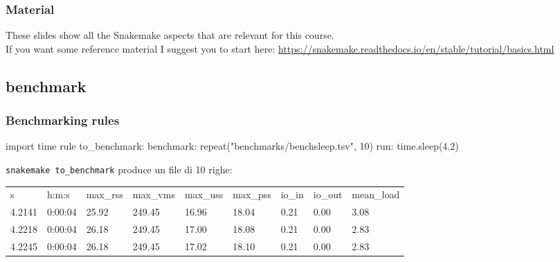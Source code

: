 \documentclass[xcolor=table]{beamer}
\begin{document}
\begin{frame}
\frametitle{Material}
These slides show all the Snakemake aspects that are relevant for this course. \\ If you want some reference material I suggest
you to start here: \url{https://snakemake.readthedocs.io/en/stable/tutorial/basics.html}
\end{frame}

\subsection{benchmark}
\begin{frame}[fragile]
\frametitle{Benchmarking rules}
\begin{python}
import time
rule to_benchmark:
	benchmark: repeat("benchmarks/benchsleep.tsv", 10)
    run: 
		time.sleep(4.2)
\end{python}
\texttt{snakemake to\_benchmark} produce un file di 10 righe:
\tiny{
\begin{table}
\centering
\begin{tabular}{lllllllll}
s      & h:m:s   & max\_rss & max\_vms & max\_uss & max\_pss & io\_in & io\_out & mean\_load  \\
4.2141 & 0:00:04 & 25.92    & 249.45   & 16.96    & 18.04    & 0.21   & 0.00    & 3.08        \\
4.2218 & 0:00:04 & 26.18    & 249.45   & 17.00    & 18.08    & 0.21   & 0.00    & 2.83        \\
4.2245 & 0:00:04 & 26.18    & 249.45   & 17.02    & 18.10    & 0.21   & 0.00    & 2.83       
\end{tabular}
\end{table}
}
\end{frame}
\end{document}
